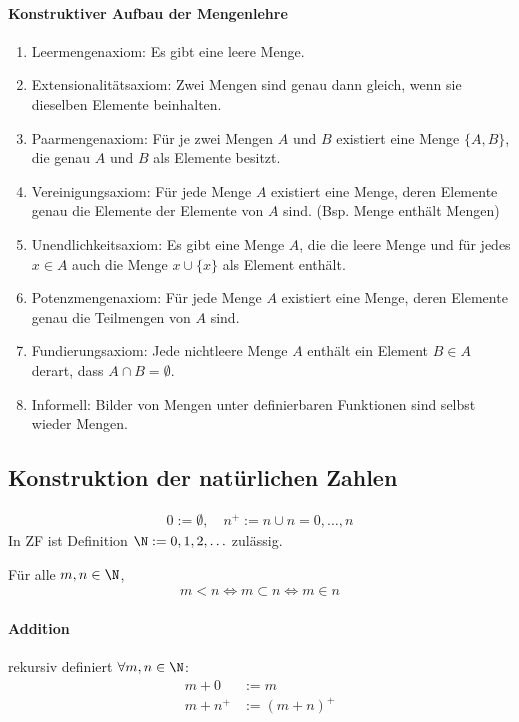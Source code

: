 \paragraph{Konstruktiver Aufbau der Mengenlehre}
\begin{enumerate}
	\item Leermengenaxiom: Es gibt eine leere Menge.
	\item Extensionalitätsaxiom: Zwei Mengen sind genau dann gleich, wenn sie dieselben
	      Elemente beinhalten.
	\item Paarmengenaxiom: Für je zwei Mengen $A$ und $B$ existiert eine Menge $\{A,
		      B\}$, die genau $A$ und $B$ als Elemente besitzt.
	\item Vereinigungsaxiom: Für jede Menge $A$ existiert eine Menge, deren Elemente
	      genau die Elemente der Elemente von $A$ sind. (Bsp. Menge enthält Mengen)
	\item Unendlichkeitsaxiom: Es gibt eine Menge $A$, die die leere Menge und für jedes
	      $x \in A$ auch die Menge $x \cup \{x\}$ als Element enthält.
	\item Potenzmengenaxiom: Für jede Menge $A$ existiert eine Menge, deren Elemente
	      genau die Teilmengen von $A$ sind.
	\item Fundierungsaxiom: Jede nichtleere Menge $A$ enthält ein Element $B \in A$
	      derart, dass $A \cap B = \emptyset$. 
	\item Informell: Bilder von Mengen unter definierbaren Funktionen sind selbst wieder
	      Mengen.
\end{enumerate}

\subsection{Konstruktion der natürlichen Zahlen}
\begin{definition}
	\begin{align*}
		0:=\emptyset,\quad n^+:=n\cup {n}={0,\dots,n}
	\end{align*}
	In ZF ist Definition $\N:={0,1,2,\dots}$ zulässig.
\end{definition}
Für alle $m,n \in \N$,
\begin{align*}
	m < n \iff m \subset n \iff m \in n
\end{align*}
\paragraph{Addition} rekursiv definiert $\forall m,n \in \N$:
\begin{align*}
	m+0   & := m      \\
	m+n^+ & :=(m+n)^+
\end{align*}
